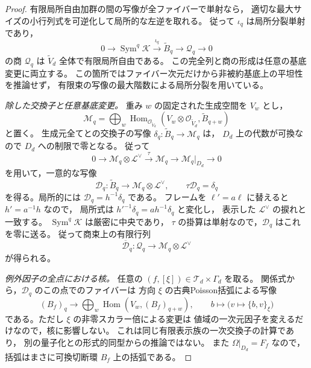 \begin{proof}
有限局所自由加群の間の写像が全ファイバーで単射なら，
適切な最大サイズの小行列式を可逆化して局所的な左逆を取れる。
従って $\iota_q$ は局所分裂単射であり，
\begin{equation}\label{eq:resolved-low-degree-bundle}
 0\longrightarrow\operatorname{Sym}^q\mathcal K
  \xrightarrow{\iota_q}\widetilde B_q
  \longrightarrow\mathcal Q_q\longrightarrow0
\end{equation}
の商 $\mathcal Q_q$ は $\widetilde V_d$ 全体で有限局所自由である。
この完全列と商の形成は任意の基底変更に両立する。
この箇所ではファイバー次元だけから非被約基底上の平坦性を推論せず，
有限束の写像の最大階数による局所分裂を用いている。

\emph{除した交換子と任意基底変更。}
重み $w$ の固定された生成空間を $V_w$ とし，
\[
 \mathcal M_q=
 \bigoplus_w\operatorname{Hom}_{\mathcal O_{\widetilde V_d}}
 (V_w\otimes\mathcal O_{\widetilde V_d},\widetilde B_{q+w})
\]
と置く。
生成元全てとの交換子の写像
$\delta_q:\widetilde B_q\to\mathcal M_q$ は，
$D_d$ 上の代数が可換なので $D_d$ への制限で零となる。
従って
\[
 0\longrightarrow\mathcal M_q\otimes\mathcal L^\vee
   \xrightarrow{\ \tau\ }\mathcal M_q
   \longrightarrow\mathcal M_q|_{D_d}\longrightarrow0
\]
を用いて，一意的な写像
\[
 \mathcal D_q:\widetilde B_q\longrightarrow
                    \mathcal M_q\otimes\mathcal L^\vee,
 \qquad \tau\mathcal D_q=\delta_q
\]
を得る。局所的には $\mathcal D_q=h^{-1}\delta_q$ である。
フレームを $\ell'=a\ell$ に替えると $h'=a^{-1}h$ なので，
局所式は $h'^{-1}\delta_q=a h^{-1}\delta_q$ と変化し，
表示した $\mathcal L^\vee$ の捩れと一致する。
$\operatorname{Sym}^q\mathcal K$ は厳密に中央であり，
$\tau$ の掛算は単射なので，$\mathcal D_q$ はこれを零に送る。
従って商束上の有限行列
\begin{equation}\label{eq:resolved-divided-commutator}
 \overline{\mathcal D}_q:\mathcal Q_q
    \longrightarrow\mathcal M_q\otimes\mathcal L^\vee
\end{equation}
が得られる。

\emph{例外因子の全点における核。}
任意の $(f,[\xi])\in\mathcal T_d\times\Gamma_d$ を取る。
関係式から，$\mathcal D_q$ のこの点でのファイバーは
方向 $\xi$ の古典Poisson括弧による写像
\[
 (B_f)_q\longrightarrow
       \bigoplus_w\operatorname{Hom}(V_w,(B_f)_{q+w}),
 \qquad b\longmapsto\bigl(v\longmapsto\{b,v\}_\xi\bigr)
\]
である。ただし $\xi$ の非零スカラー倍による変更は
値域の一次元因子を変えるだけなので，核に影響しない。
これは同じ有限表示族の一次交換子の計算であり，
別の量子化との形式的同型からの推論ではない。
また $\Omega|_{D_d}=F_f$ なので，括弧はまさに可換切断環 $B_f$ 上の括弧である。


\end{proof}
